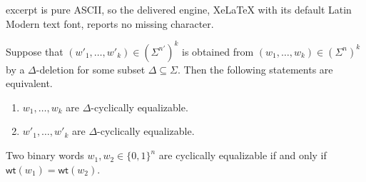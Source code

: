\documentclass[10pt,a4paper]{amsart}
\newcommand{\wt}{\mathsf{wt}}
\begin{document}
excerpt is pure ASCII, so the delivered engine, XeLaTeX with its default Latin Modern text font, reports no missing character.
\begin{corollary}
    \label{cor:equalizability_is_invariant_under_insertion}
    Suppose that $(w'_1,\dots,w'_k)\in (\Sigma^{n'})^k$ is obtained from $(w_1,\dots,w_k)\in (\Sigma^{n})^k$ by a $\Delta$-deletion for some subset $\Delta \subseteq \Sigma$. 
    Then the following statements are equivalent.
    \begin{enumerate}
        \item $w_1,\dots,w_k$ are $\Delta$-cyclically equalizable.
        \item $w'_1,\dots,w'_k$ are $\Delta$-cyclically equalizable.
    \end{enumerate}
\end{corollary}

\begin{theorem}
    \label{thm:criterion_for_two_binary_words}
    Two binary words $w_1,w_2 \in \{0,1\}^n$ are cyclically equalizable if and only if $\wt(w_1) = \wt(w_2)$.
\end{theorem}
\end{document}
